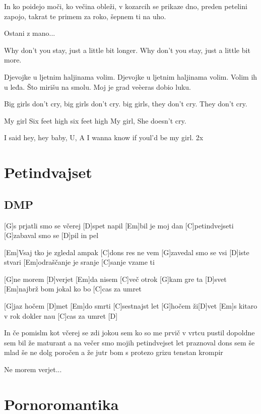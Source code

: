 \documentclass[a4paper,12pt]{article}
\begin{document}
\begin{multicols}{2}
\begin{guitar}
    
In ko poidejo moči, ko večina obleži, 
v kozarcih se prikaze dno, 
preden petelini zapojo, 
takrat te primem za roko, šepnem ti na uho.


Ostani z mano...


Why don't you stay,
just a little bit longer.
Why don't you stay,
just a little bit more.


Djevojke u ljetnim haljinama volim.
Djevojke u ljetnim haljinama volim.
Volim ih u leđa.
Što mirišu na smolu.
Moj je grad veèeras dobio luku.


Big girls don't cry,
big girls don't cry.
big girls, they don't cry.
They don't cry.


My girl
Six feet high
six feet high
My girl, She doesn't cry.


I said hey, hey baby, U, A
I wanna know if youl'd be my girl. 2x

\end{guitar}
\section{Petindvajset}
\subsection*{DMP}
\begin{guitar}

[G]s prjatli smo se včerej [D]spet napil
[Em]bil je moj dan [C]petindvejseti
[G]zabaval smo se [D]pil in pel


[Em]Vsaj tko je zgledal ampak [C]dons res ne vem
[G]zavedal smo se vsi [D]iste stvari
[Em]odraščanje je sranje [C]sanje vzame ti


[G]ne morem [D]verjet
[Em]da nisem [C]več otrok
[G]kam gre ta [D]svet
[Em]najbrž bom jokal ko bo [C]cas za umret


[G]jaz hočem [D]met
[Em]do smrti [C]sestnajst let
[G]hočem ži[D]vet
[Em]s kitaro v rok dokler nau [C]cas za umret [D]


In če pomislm kot včerej se zdi
jokou sem ko so me prvič v vrtcu pustil
dopoldne sem bil že maturant
a na večer smo mojih 
petindvejset let praznoval
dons sem še mlad še ne dolg poročen
a že jutr bom s protezo grizu tenstan krompir


Ne morem verjet...

\end{guitar}
\section{Pornoromantika}

\end{multicols}
\end{document}
